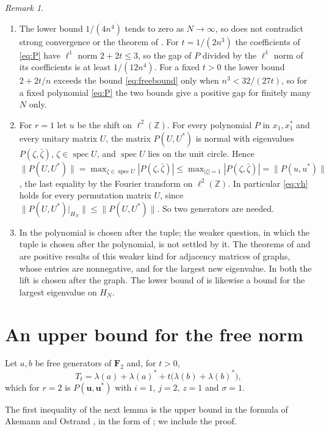 \documentclass[11pt]{article}
\theoremstyle{remark}
\newtheorem{remark}[theorem]{Remark}
\begin{document}
\begin{remark}\label{rem:scope}
\begin{enumerate}[label=(\alph*)]
\item The lower bound $1/(4n^4)$ tends to zero as $N\to\infty$, so  does not contradict strong
convergence or the theorem of \cite{OW}. For $t=1/(2n^3)$ the coefficients of \eqref{eq:P} have $\ell^1$ norm
$2+2t\le 3$, so the gap of $P$ divided by the $\ell^1$ norm of its coefficients is at least $1/(12n^4)$. For a fixed $t>0$
the lower bound $2+2t/n$ exceeds the bound \eqref{eq:freebound} only when $n^3<32/(27t)$, so for a fixed
polynomial \eqref{eq:P} the two bounds give a positive gap for finitely many $N$ only.
\item For $r=1$ let $u$ be the shift on $\ell^2(\mathbb Z)$. For every polynomial $P$ in $x_1,x_1^*$ and every unitary
matrix $U$, the matrix $P(U,U^*)$ is normal with eigenvalues $P(\zeta,\bar\zeta)$, $\zeta\in\operatorname{spec}U$,
and $\operatorname{spec}U$ lies on the unit circle. Hence $\|P(U,U^*)\|=\max_{\zeta\in\operatorname{spec}U}|P(\zeta,\bar\zeta)|
\le\max_{|\zeta|=1}|P(\zeta,\bar\zeta)|=\|P(u,u^*)\|$, the last equality by the Fourier transform on $\ell^2(\mathbb Z)$.
In particular \eqref{eq:vh} holds for every permutation matrix $U$, since
$\|P(U,U^*)|_{H_N}\|\le\|P(U,U^*)\|$. So two
generators are needed.
\item In  the polynomial is chosen after the tuple; the weaker question, in which the tuple is chosen
after the polynomial, is not settled by it. The theorems of \cite{HPS} and \cite{MO} are positive results of this
weaker kind for adjacency matrices of graphs, whose entries are nonnegative, and for the largest new eigenvalue. In
both the lift is chosen after the graph. The lower bound of  is likewise a bound for the largest
eigenvalue on $H_N$.
\end{enumerate}
\end{remark}


\section{An upper bound for the free norm}\label{sec:free}

Let $a,b$ be free generators of $\mathbf F_2$
and, for $t>0$,
\[
  T_t=\lambda(a)+\lambda(a)^*+t\bigl(\lambda(b)+\lambda(b)^*\bigr),
\]
which for $r=2$ is $P(\mathbf u,\mathbf u^*)$ with $i=1$, $j=2$, $z=1$ and $\sigma=1$. 

The first inequality of the next lemma is the upper bound in the formula of Akemann and Ostrand \cite{AO}, in
the form of \cite[(62)]{BL}; we include the proof.
\end{document}
